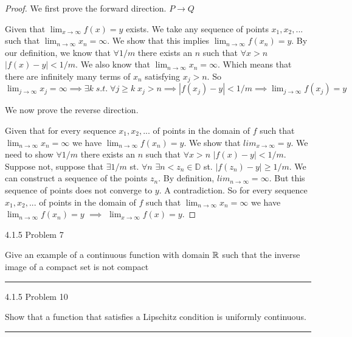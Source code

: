 \documentclass[11pt]{article}
\begin{document}
\begin{proof}

We first prove the forward direction. $P \to Q$

Given that $\lim_{x \to \infty} f(x) = y$ exists. We take any sequence of points $x_1, x_2, ...$ such that $\lim_{n \to \infty} x_n = \infty$. We show that this implies $\lim_{n \to \infty} f(x_n) = y$. By our definition, we know that $\forall 1/m$ there exists an $n$ such that $\forall x > n$ $|f(x) - y| < 1/m$. We also know that $\lim_{n \to \infty} x_n = \infty$. Which means that there are infinitely many terms of $x_n$ satisfying $x_j > n$. So $\lim_{j \to \infty} x_j = \infty \implies \exists k \; s.t. \; \forall j \geq k \; x_j > n \implies |f(x_j) - y| < 1/m \implies \lim_{j \to \infty} f(x_j) = y$

We now prove the reverse direction.

Given that for every sequence $x_1, x_2, ...$ of points in the domain of $f$ such that $\lim_{n \to \infty} x_n = \infty$ we have $\lim_{n\to \infty} f(x_n) = y$. 
We show that $lim_{x \to \infty} = y$. We need to show $\forall 1/m$ there exists an $n$ such that $\forall x > n$ $|f(x) - y| < 1/m$. 
Suppose not, suppose that $\exists 1/m$ st. $\forall n$ $\exists n < z_n \in \mathbb{D}$ st. $|f(z_n) - y| \geq 1/m$. We can construct a sequence of the points $z_n$. By definition, $lim_{n \to \infty} = \infty$. But this sequence of points does not converge to $y$. A contradiction. So for every sequence $x_1, x_2, ...$ of points in the domain of $f$ such that $\lim_{n \to \infty} x_n = \infty$ we have $\lim_{n\to \infty} f(x_n) = y$ $\implies$ $\lim_{x \to \infty} f(x) = y$.

\end{proof}





\newpage
{} 4.1.5 Problem 7

Give an example of a continuous function with domain $\mathbb{R}$ such that the inverse image of a compact set is not compact

\hrule

\newpage
{} 4.1.5 Problem 10

Show that a function that satisfies a Lipschitz condition is uniformly continuous.
\hrule
\end{document}
